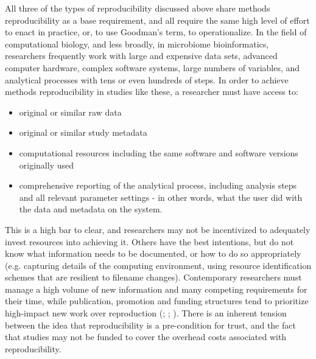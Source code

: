 All three of the types of reproducibility discussed above share methods
reproducibility as a base requirement, and all require the same high level of
effort to enact in practice, or, to use Goodman’s term, to operationalize. In
the field of computational biology, and less broadly, in microbiome
bioinformatics, researchers frequently work with large and expensive data sets,
advanced computer hardware, complex software systems, large numbers of
variables, and analytical processes with tens or even hundreds of steps. In
order to achieve methods reproducibility in studies like these, a researcher
must have access to:
\begin{itemize}
    \item original or similar raw data
    \item original or similar study metadata
    \item computational resources including the same software and software versions originally used
    \item comprehensive reporting of the analytical process, including analysis steps and all relevant parameter settings - in other words, what the user did with the data and metadata on the system.
\end{itemize}
This is a high bar to clear, and researchers may not be incentivized to
adequately invest resources into achieving it. Others have the best intentions,
but do not know what information needs to be documented, or how to do so
appropriately (e.g. capturing details of the computing environment, using
resource identification schemes that are resilient to filename changes).
Contemporary researchers must manage a high volume of new information and many
competing requirements for their time, while publication, promotion and funding
structures tend to prioritize high-impact new work over reproduction
(\cite{community_turing_2021}; \cite{shiffrin_scientific_2018}; \cite{munafo_manifesto_2017}).
There is an inherent tension between the idea that reproducibility is a
pre-condition for trust, and the fact that studies may not be funded to cover
the overhead costs associated with reproducibility.

